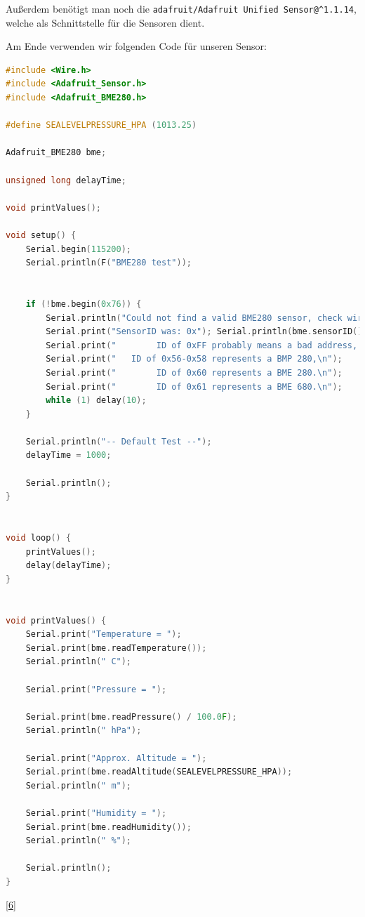 \documentclass[
    headings=optiontotocandhead,%
    twoside,
    numbers=noenddot,%
    12pt, %
    titlepage, %
    parskip=full, %
    listof=leveldown, 
    numbers=noenddot, %
    a4paper,DIV=14,
    BCOR=15mm,
]{scrbook}
\newcommand{\passthrough}[1]{#1}
\begin{document}
Außerdem benötigt man noch die
\passthrough{\lstinline!adafruit/Adafruit Unified Sensor@^1.1.14!},
welche als Schnittstelle für die Sensoren dient.

Am Ende verwenden wir folgenden Code für unseren Sensor:

\begin{lstlisting}[language={C++}, caption={BME Testprogramm}]
#include <Wire.h>
#include <Adafruit_Sensor.h>
#include <Adafruit_BME280.h>

#define SEALEVELPRESSURE_HPA (1013.25)

Adafruit_BME280 bme; 

unsigned long delayTime;

void printValues();

void setup() {
    Serial.begin(115200);
    Serial.println(F("BME280 test"));

    
    if (!bme.begin(0x76)) {
        Serial.println("Could not find a valid BME280 sensor, check wiring, address, sensor ID!");
        Serial.print("SensorID was: 0x"); Serial.println(bme.sensorID(),16);
        Serial.print("        ID of 0xFF probably means a bad address, a BMP 180 or BMP 085\n");
        Serial.print("   ID of 0x56-0x58 represents a BMP 280,\n");
        Serial.print("        ID of 0x60 represents a BME 280.\n");
        Serial.print("        ID of 0x61 represents a BME 680.\n");
        while (1) delay(10);
    }
    
    Serial.println("-- Default Test --");
    delayTime = 1000;

    Serial.println();
}


void loop() { 
    printValues();
    delay(delayTime);
}


void printValues() {
    Serial.print("Temperature = ");
    Serial.print(bme.readTemperature());
    Serial.println(" C");

    Serial.print("Pressure = ");

    Serial.print(bme.readPressure() / 100.0F);
    Serial.println(" hPa");

    Serial.print("Approx. Altitude = ");
    Serial.print(bme.readAltitude(SEALEVELPRESSURE_HPA));
    Serial.println(" m");

    Serial.print("Humidity = ");
    Serial.print(bme.readHumidity());
    Serial.println(" %");

    Serial.println();
}
\end{lstlisting}

{[}\protect\hyperlink{ref-BME280-Test}{6}{]}
\end{document}

